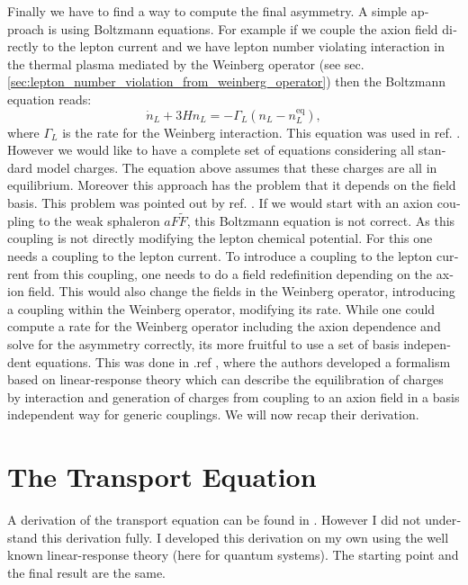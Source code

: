 \documentclass[master,       %
               twoside,        %
               BCOR10mm,       %
               english,ngerman, %
               ]{GAUBM}
\begin{document}
\begin{otherlanguage}{english}
Finally we have to find a way to compute the final asymmetry.
A simple approach is using Boltzmann equations. For example if we couple
the axion field directly to the lepton current and we have lepton number violating interaction in the thermal plasma mediated by the Weinberg operator (see sec. \ref{sec:lepton_number_violation_from_weinberg_operator})
then the Boltzmann equation reads:
\begin{equation}
	\dot{n}_L + 3 H n_L = - \Gamma_L (n_L - n_L^\mathrm{eq}),
\end{equation}
where $\Gamma_L$ is the rate for the Weinberg interaction.
This equation was used in ref. \cite{Kusenko_2015_Axion_Leptogenesis}.
However we would like to have a complete set of equations considering all standard model charges. The equation above assumes that these charges are all in equilibrium.
Moreover this approach has the problem that it depends on the field basis.
This problem was pointed out by ref. \cite{Shi_2015_Basis_Invariance_chemical_equilibrium}.
If we would start with an axion coupling to the weak sphaleron $a F \tilde{F}$, this Boltzmann equation is not correct. As this coupling is not directly modifying the lepton chemical potential. For this one needs a coupling to the lepton current.
To introduce a coupling to the lepton current from this coupling, one needs to do a field redefinition depending on the axion field. This would also change the fields in the Weinberg operator, introducing a coupling within the Weinberg operator, modifying its rate. While one could compute a rate for the Weinberg operator including the axion dependence and solve for the asymmetry correctly, its more fruitful to use a set of basis independent equations.
This was done in .ref \cite{Domcke:2020kcp_Generic_Couplings}, where the authors developed a formalism based on linear-response theory which can describe the equilibration of charges by interaction and generation of charges from coupling to an axion field in a basis independent way for generic couplings. We will now recap their derivation.

\chapter{The Transport Equation}
\label{sec:transport_equation}
A derivation of the transport equation can be found in \cite[appendix B]{Domcke:2020kcp_Generic_Couplings}.
However I did not understand this derivation fully. I developed this derivation on my own using the well known linear-response theory (here for quantum systems). 
The starting point and the final result are the same.


\end{otherlanguage}
\end{document}
